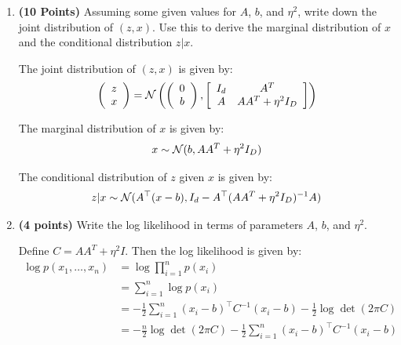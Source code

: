 \begin{enumerate}
\item \textbf{(10 Points)}
Assuming some given values for $A$, $b$, and $\eta^2$, write down the joint distribution of $(z,x)$. Use this to derive the marginal
distribution of $x$ and the conditional distribution $z|x$. 

\begin{soln}
  The joint distribution of $(z,x)$ is given by:
  \begin{align*}
    \left(\begin{array}{c}z \\ x\end{array}\right) =
  \mathcal{N} \left( \left(\begin{array}{c} 0 \\ b \end{array} \right), 
  \left[ \begin{array}{cc} I_d & A^T \\ A &
    AA^T + \eta^2 I_D \end{array} \right] 
  \right)
  \end{align*}

  The marginal distribution of $x$ is given by:
  \begin{align*}
    x \sim \mathcal{N}(b, AA^T + \eta^2 I_D)
  \end{align*}

  The conditional distribution of $z$ given $x$ is given by:
  \begin{align*}
    z | x \sim \mathcal{N}(A^\top (x - b), I_d - A^\top (AA^T + \eta^2 I_D)^{-1} A)
  \end{align*}
\end{soln}

\item \textbf{(4 points)}
Write the log likelihood in terms of parameters $A$, $b$, and $\eta^2$.

\begin{soln}
  Define $C = AA^T + \eta^2 I$. Then the log likelihood is given by:
  \begin{align*}
    \log p(x_1, \ldots, x_n) &= \log \prod_{i=1}^n p(x_i) \\
    &= \sum_{i=1}^n \log p(x_i) \\
    &= -\frac{1}{2} \sum_{i=1}^n (x_i - b)^\top C^{-1} (x_i - b) - \frac{1}{2} \log \det (2\pi C) \\
    &= -\frac{n}{2} \log \det (2\pi C) - \frac{1}{2} \sum_{i=1}^n (x_i - b)^\top C^{-1} (x_i - b)
  \end{align*}
\end{soln}


\end{enumerate}
